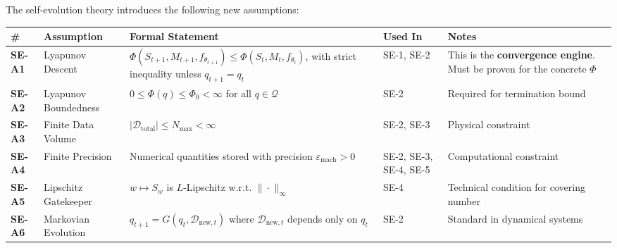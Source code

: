 \documentclass[
  12pt,
]{article}
\begin{document}
The self-evolution theory introduces the following new assumptions:

\begin{longtable}[]{@{}
  >{\raggedright\arraybackslash}p{}
  >{\raggedright\arraybackslash}p{}
  >{\raggedright\arraybackslash}p{}
  >{\raggedright\arraybackslash}p{}
  >{\raggedright\arraybackslash}p{}@{}}
\toprule\noalign{}
\begin{minipage}[b]{\linewidth}\raggedright
\#
\end{minipage} & \begin{minipage}[b]{\linewidth}\raggedright
Assumption
\end{minipage} & \begin{minipage}[b]{\linewidth}\raggedright
Formal Statement
\end{minipage} & \begin{minipage}[b]{\linewidth}\raggedright
Used In
\end{minipage} & \begin{minipage}[b]{\linewidth}\raggedright
Notes
\end{minipage} \\
\midrule\noalign{}
\endhead
\bottomrule\noalign{}
\endlastfoot
\textbf{SE-A1} & Lyapunov Descent &
\(\Phi(S_{t+1}, M_{t+1}, f_{\theta_{t+1}}) \leq \Phi(S_t, M_t, f_{\theta_t})\),
with strict inequality unless \(q_{t+1} = q_t\) & SE-1, SE-2 & This is
the \textbf{convergence engine}. Must be proven for the concrete
\(\Phi\) \\
\textbf{SE-A2} & Lyapunov Boundedness &
\(0 \leq \Phi(q) \leq \Phi_0 < \infty\) for all \(q \in \mathcal{Q}\) &
SE-2 & Required for termination bound \\
\textbf{SE-A3} & Finite Data Volume &
\(|\mathcal{D}_{\text{total}}| \leq N_{\text{max}} < \infty\) & SE-2,
SE-3 & Physical constraint \\
\textbf{SE-A4} & Finite Precision & Numerical quantities stored with
precision \(\varepsilon_{\text{mach}} > 0\) & SE-2, SE-3, SE-4, SE-5 &
Computational constraint \\
\textbf{SE-A5} & Lipschitz Gatekeeper & \(w \mapsto S_w\) is
\(L\)-Lipschitz w.r.t. \(\|\cdot\|_\infty\) & SE-4 & Technical condition
for covering number \\
\textbf{SE-A6} & Markovian Evolution &
\(q_{t+1} = G(q_t, \mathcal{D}_{\text{new}, t})\) where
\(\mathcal{D}_{\text{new}, t}\) depends only on \(q_t\) & SE-2 &
Standard in dynamical systems \\
\end{longtable}
\end{document}
